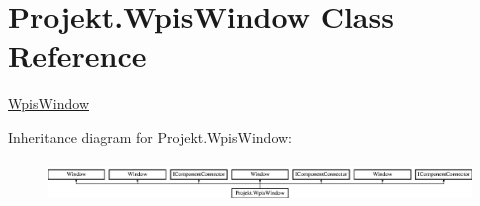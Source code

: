 \hypertarget{class_projekt_1_1_wpis_window}{}\section{Projekt.\+Wpis\+Window Class Reference}
\label{class_projekt_1_1_wpis_window}


\mbox{\hyperlink{class_projekt_1_1_wpis_window}{Wpis\+Window}}  


Inheritance diagram for Projekt.\+Wpis\+Window\+:\begin{figure}[H]
\begin{center}
\leavevmode
\includegraphics[height=1.103448cm]{class_projekt_1_1_wpis_window}
\end{center}
\end{figure}
